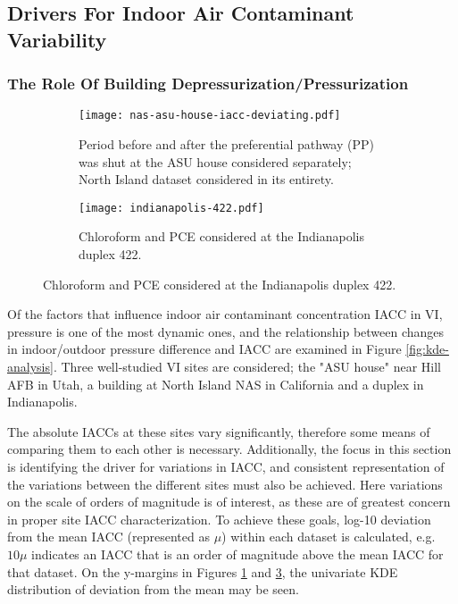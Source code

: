 \documentclass[journal=esthag,manuscript=article]{achemso}
\begin{document}
\subsection{Drivers For Indoor Air Contaminant Variability}
\subsubsection{The Role Of Building Depressurization/Pressurization}
\begin{figure}[htb!]
  \caption{KDE analysis of IACC dependence on indoor/outdoor pressure difference at the ASU house and North Island site (\ref{fig:kde-asu-nas}) and the Indianapolis site (\ref{fig:kde-indianapolis}). p-values and Pearson's r-values shown for each dataset.}
  \label{fig:kde-analysis}
  \begin{subfigure}{\textwidth}
    \centering
    \caption{Period before and after the preferential pathway (PP) was shut at the ASU house considered separately; North Island dataset considered in its entirety.}
    \label{fig:kde-asu-nas}
    \texttt{[image: nas-asu-house-iacc-deviating.pdf]}
  \end{subfigure}
  \begin{subfigure}{\textwidth}
    \centering
    \caption{Chloroform and PCE considered at the Indianapolis duplex 422.}
    \label{fig:kde-indianapolis}
    \texttt{[image: indianapolis-422.pdf]}
  \end{subfigure}
\end{figure}
Of the factors that influence indoor air contaminant concentration IACC in VI, pressure is one of the most dynamic ones, and the relationship between changes in indoor/outdoor pressure difference and IACC are examined in Figure \ref{fig:kde-analysis}.
Three well-studied VI sites are considered; the "ASU house" near Hill AFB in Utah, a building at North Island NAS in California and a duplex in Indianapolis.\par
The absolute IACCs at these sites vary significantly, therefore some means of comparing them to each other is necessary.
Additionally, the focus in this section is identifying the driver for variations in IACC, and consistent representation of the variations between the different sites must also be achieved.
Here variations on the scale of orders of magnitude is of interest, as these are of greatest concern in proper site IACC characterization.
To achieve these goals, log-10 deviation from the mean IACC (represented as $\mu$) within each dataset is calculated, e.g. $10\mu$ indicates an IACC that is an order of magnitude above the mean IACC for that dataset.
On the y-margins in Figures \ref{fig:kde-asu-nas} and \ref{fig:kde-indianapolis}, the univariate KDE distribution of deviation from the mean may be seen. \par
\end{document}
